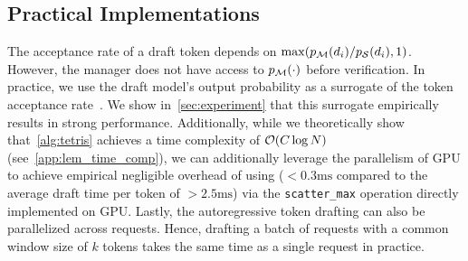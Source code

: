 \subsection{Practical Implementations}\label{sec:practical-implementations}

The acceptance rate of a draft token depends on $\max(p_{\mathcal{M}}(d_i)/p_{\mathcal{S}}(d_i),1)$. 
However, the \alg{} manager does not have access to $p_{\mathcal{M}}(\cdot)$ before verification.
In practice, we use the draft model's output probability as a surrogate of the token acceptance rate~\citep{kim2023speculativedecodingbiglittle,zhang2024skiplayer}.
We show in~\cref{sec:experiment} that this surrogate empirically results in strong performance.
Additionally, while we theoretically show that~\cref{alg:tetris} achieves a time complexity of ${\mathcal{O}}(C\log N)$ (see~\cref{app:lem_time_comp}), we can additionally leverage the parallelism of GPU to achieve empirical negligible overhead of using \alg{} ($< 0.3 \text{ms}$ compared to the average draft time per token of $> 2.5\text{ms}$) via the \texttt{scatter\_max} operation directly implemented on GPU.
Lastly, the autoregressive token drafting can also be parallelized across requests.
Hence, drafting a batch of requests with a common window size of $k$ tokens takes the same time as a single request in practice.
